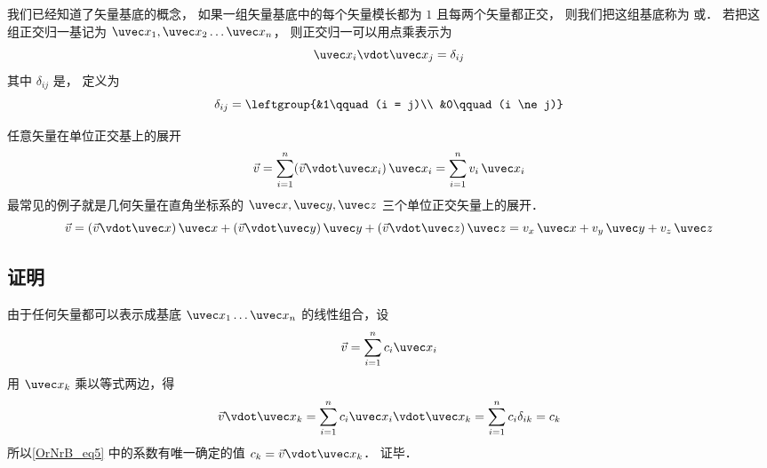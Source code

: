 

我们已经知道了矢量基底的概念， 如果一组矢量基底中的每个矢量模长都为 $1$ 且每两个矢量都正交， 则我们把这组基底称为 或． 若把这组正交归一基记为 $\uvec x_1,\uvec x_2\dots\uvec x_n$， 则正交归一可以用点乘表示为
\begin{equation}
\uvec x_i \vdot \uvec x_j = \delta_{ij}
\end{equation}
其中 $\delta_{ij}$ 是， 定义为
\begin{equation}\label{OrNrB_eq2}
\delta_{ij} = \leftgroup{&1\qquad (i = j)\\ &0\qquad (i \ne j)}
\end{equation}

任意矢量在单位正交基上的展开
 \begin{equation}
\vec v = \sum_{i = 1}^n (\vec v\vdot\uvec x_i)\,\uvec x_i = \sum_{i = 1}^n v_i \,\uvec x_i
\end{equation}
最常见的例子就是几何矢量在直角坐标系的 $\uvec x, \uvec y, \uvec z$ 三个单位正交矢量上的展开．
 \begin{equation}
\vec v = (\vec v \vdot \uvec x)\,\uvec x + (\vec v \vdot \uvec y)\,\uvec y + (\vec v \vdot \uvec z)\,\uvec z = v_x \,\uvec x + v_y \,\uvec y + v_z \,\uvec z
\end{equation} 

\subsection{证明}
由于任何矢量都可以表示成基底 $\uvec x_1 \dots \uvec x_n$ 的线性组合，设
\begin{equation}\label{OrNrB_eq5}
\vec v = \sum_{i = 1}^n c_i \uvec x_i
\end{equation} 
用 $\uvec x_k$ 乘以等式两边，得
\begin{equation}
\vec v \vdot \uvec x_k = \sum_{i = 1}^n  c_i \uvec x_i \vdot\uvec x_k = \sum_{i = 1}^n c_i \delta_{ik}  = c_k
\end{equation}
所以\autoref{OrNrB_eq5} 中的系数有唯一确定的值 $c_k = \vec v \vdot\uvec x_k$． 证毕．






